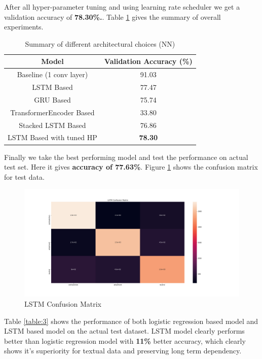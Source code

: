 \documentclass[10pt,a4paper]{article}
\begin{document}
After all hyper-parameter tuning and using learning rate scheduler we get a validation accuracy of \textbf{78.30\%.}. Table \ref{table:2} gives the summary of overall experiments.

\begin{table}[h!]
\centering
\begin{tabular}{|c| c|} 
 \hline
 Model & Validation Accuracy (\%) \\
 \hline\hline
 Baseline (1 conv layer) & 91.03 \\ 
 \hline
LSTM Based & 77.47 \\ 
 \hline
 GRU Based & 75.74 \\ 
 \hline
TransformerEncoder Based & 33.80 \\ 
 \hline
Stacked LSTM Based  & 76.86 \\ 
 \hline
LSTM Based with tuned HP & \textbf{78.30} \\ 
 \hline
\end{tabular}
\caption{Summary of different architectural choices (NN) }
\label{table:2}
\end{table}

Finally we take the best performing model and test the performance on actual test set. Here it gives \textbf{accuracy of 77.63\%}. Figure \ref{nncm} shows the confusion matrix for test data. 

\begin{figure}[h!]
	\includegraphics[width=1.3\linewidth]{cm_lstm.png}
	\caption{LSTM Confusion Matrix}
	\label{nncm}
\end{figure}


Table \ref{table:3} shows the performance of both logistic regression based model and LSTM based model on the actual test dataset. LSTM model clearly performs better than logistic regression model with \textbf{11\%} better accuracy, which clearly shows it's superiority for textual data and preserving long term dependency.
\end{document}
